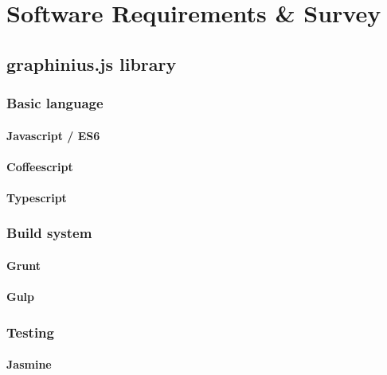 \chapter{Software Requirements \& Survey}
\label{ch:software_requirements}


\section{graphinius.js library}
\label{library}

	\subsection{Basic language}
	\label{ssect:language}
	
		\subsubsection{Javascript / ES6}
		\label{sssect:js_es6}
		
		\subsubsection{Coffeescript}
		\label{sssect:coffeescript}
		
		\subsubsection{Typescript}
		\label{sssect:typescript}
	
	\subsection{Build system}
	\label{ssect:build_system}
	
		\subsubsection{Grunt}
		\label{sssect:grunt}
		
		\subsubsection{Gulp}
		\label{sssect:gulp}
	
	\subsection{Testing}
	\label{ssect:testing}
	
		\subsubsection{Jasmine}
		\label{sssect:jasmine}
		
